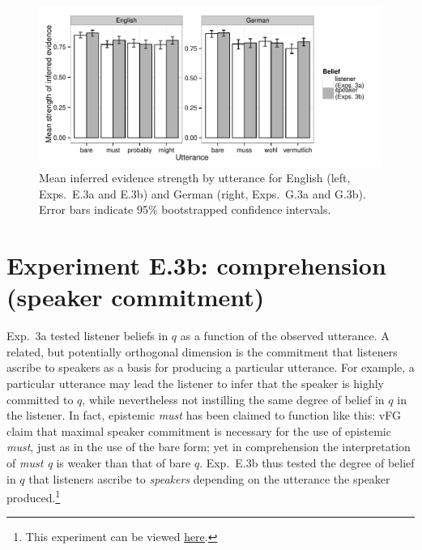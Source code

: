 \documentclass[11pt]{article}
\begin{document}
\begin{figure}
	\centering
	\includegraphics[width=\textwidth]{pics/mean-evidence}
	\caption{Mean inferred evidence strength by utterance for English (left, Exps.~E.3a and E.3b) and German (right, Exps.~G.3a and G.3b). Error bars indicate 95\% bootstrapped confidence intervals.}
	\label{fig:exp3-evidence}
\end{figure}

\section{Experiment E.3b: comprehension (speaker commitment)}


Exp.~3a tested listener beliefs in $q$ as a function of the observed utterance. A related, but potentially orthogonal dimension is the commitment that listeners ascribe to speakers as a basis for producing a particular utterance. For example, a particular utterance may lead the listener to infer that the speaker is highly committed to $q$, while nevertheless not instilling the same degree of belief in $q$ in the listener. In fact, epistemic \emph{must} has been claimed to function like this: vFG claim that maximal speaker commitment is necessary for the use of epistemic \emph{must}, just as in the use of the bare form; yet in comprehension the interpretation of \emph{must q} is weaker than that of bare $q$.  Exp.~E.3b thus tested the degree of belief in $q$ that listeners ascribe to \emph{speakers} depending on the utterance the speaker produced.\footnote{This experiment can be viewed \href{http://stanford.edu/~jdegen/80_modals_comprehension_speakerbelief/modals.html}{here}.}
\end{document}
